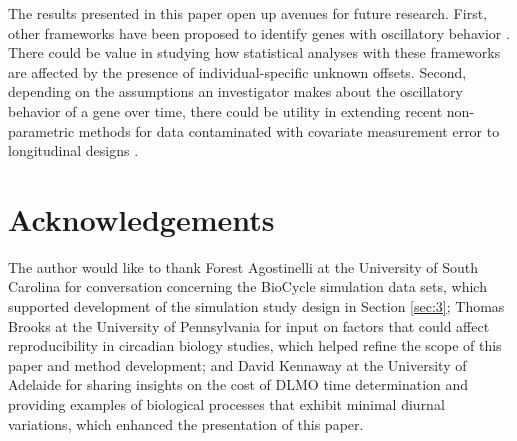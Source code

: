 The results presented in this paper open up avenues for future research. First, other frameworks have been proposed to identify genes with oscillatory behavior \citep{Mei2020}. There could be value in studying how statistical analyses with these frameworks are affected by the presence of individual-specific unknown offsets. Second, depending on the assumptions an investigator makes about the oscillatory behavior of a gene over time, there could be utility in extending recent non-parametric methods for data contaminated with covariate measurement error to longitudinal designs \citep{Delaigle2016, DiMarzio2021, Dimarzio2023, Nghiem2018, Nghiem2020}.

\section*{Acknowledgements}
The author would like to thank Forest Agostinelli at the University of South Carolina for conversation concerning the BioCycle simulation data sets, which supported development of the simulation study design in Section \ref{sec:3}; Thomas Brooks at the University of Pennsylvania for input on factors that could affect reproducibility in circadian biology studies, which helped refine the scope of this paper and method development; and David Kennaway at the University of Adelaide for sharing insights on the cost of DLMO time determination and providing examples of biological processes that exhibit minimal diurnal variations, which enhanced the presentation of this paper. 

\newpage
\clearpage


